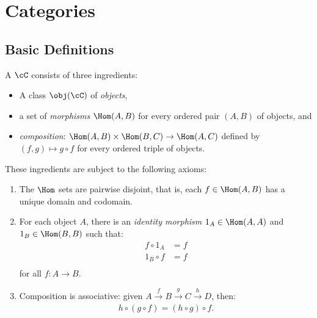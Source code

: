\chapter{Categories}
\vspace{12pt}

\section{Basic Definitions}
    \begin{definition}
        A  $\cC$ consists of three ingredients:
            \begin{itemize}
                \item A class $\obj(\cC)$ of \textit{objects},
                \item a set of \textit{morphisms} $\Hom(A,B)$ for every ordered pair $(A,B)$ of objects, and
                \item \textit{composition}: $\Hom(A,B)\times \Hom(B,C) \rightarrow \Hom(A,C)$ defined by $(f,g) \mapsto g \circ f$ for every ordered triple of objects.
            \end{itemize}
        These ingredients are subject to the following axioms:
            \begin{enumerate}[label = (\arabic*)]
                \item The $\Hom$ sets are pairwise disjoint, that is, each $f \in \Hom(A,B)$ has a unique domain and codomain.
                \item For each object $A$, there is an \textit{identity morphism} $1_A \in \Hom(A,A)$ and $1_B \in \Hom(B,B)$ such that:
                    \begin{equation*}
                    \begin{split}
                        f\circ1_A &= f \\
                        1_B \circ f &= f \\
                    \end{split}
                    \end{equation*}
                for all $f:A \rightarrow B$.
                \item Composition is associative: given $A \xrightarrow{f} B \xrightarrow{g} C \xrightarrow{h}D$, then:
                    \begin{equation*}
                    \begin{split}
                        h\circ(g\circ f) = (h\circ g) \circ f.
                    \end{split}
                    \end{equation*}
            \end{enumerate}
    \end{definition}

